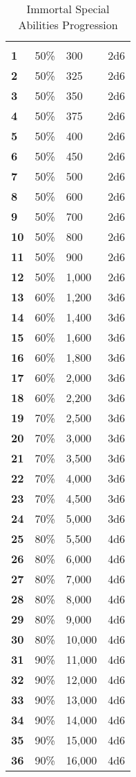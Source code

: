 \begin{multicols*}{2}

\begin {table}[H]
  \caption{Immortal Special Abilities Progression}
  \begin{tabularx}{\columnwidth}{>{\bfseries}YYYY}
	 &  &  & \\
	1 & 50\% & 300 & 2d6\\
	2 & 50\% & 325 & 2d6\\
	3 & 50\% & 350 & 2d6\\
	4 & 50\% & 375 & 2d6\\
	5 & 50\% & 400 & 2d6\\
	6 & 50\% & 450 & 2d6\\
	7 & 50\% & 500 & 2d6\\
	8 & 50\% & 600 & 2d6\\
	9 & 50\% & 700 & 2d6\\
	10 & 50\% & 800 & 2d6\\
	11 & 50\% & 900 & 2d6\\
	12 & 50\% & 1,000 & 2d6\\
	13 & 60\% & 1,200 & 3d6\\
	14 & 60\% & 1,400 & 3d6\\
	15 & 60\% & 1,600 & 3d6\\
	16 & 60\% & 1,800 & 3d6\\
	17 & 60\% & 2,000 & 3d6\\
	18 & 60\% & 2,200 & 3d6\\
	19 & 70\% & 2,500 & 3d6\\
	20 & 70\% & 3,000 & 3d6\\
	21 & 70\% & 3,500 & 3d6\\
	22 & 70\% & 4,000 & 3d6\\
	23 & 70\% & 4,500 & 3d6\\
	24 & 70\% & 5,000 & 3d6\\
	25 & 80\% & 5,500 & 4d6\\
	26 & 80\% & 6,000 & 4d6\\
	27 & 80\% & 7,000 & 4d6\\
	28 & 80\% & 8,000 & 4d6\\
	29 & 80\% & 9,000 & 4d6\\
	30 & 80\% & 10,000 & 4d6\\
	31 & 90\% & 11,000 & 4d6\\
	32 & 90\% & 12,000 & 4d6\\
	33 & 90\% & 13,000 & 4d6\\
	34 & 90\% & 14,000 & 4d6\\
	35 & 90\% & 15,000 & 4d6\\
	36 & 90\% & 16,000 & 4d6
  \end {tabularx}
\end {table}


\end{multicols*}

